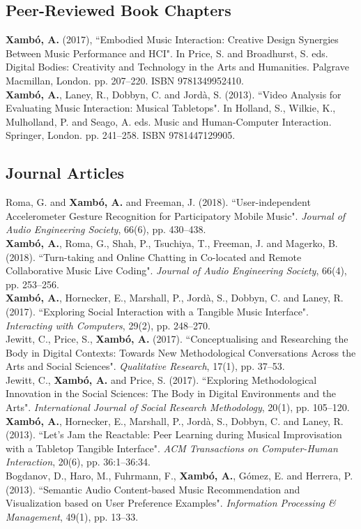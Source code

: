 \documentclass[10pt, a4paper]{article}
\newcommand{\years}[1]{\marginnote{\scriptsize #1}}
\begin{document}
\subsection*{Peer-Reviewed Book Chapters}
\noindent
\years{2016}\textbf{Xambó, A.} (2017), “Embodied Music Interaction: Creative Design Synergies Between Music Performance and HCI". In Price, S. and Broadhurst, S. eds. Digital Bodies: Creativity and Technology in the Arts and Humanities. Palgrave Macmillan, London. pp. 207--220. ISBN 9781349952410.\\
\years{2013}\textbf{Xambó, A.}, Laney, R., Dobbyn, C. and Jordà, S. (2013). “Video Analysis for Evaluating Music Interaction: Musical Tabletops". In Holland, S., Wilkie, K., Mulholland, P. and Seago, A. eds. Music and Human-Computer Interaction. Springer, London. pp. 241--258. ISBN 9781447129905.\\

\subsection*{Journal Articles}
\noindent
\years{2018b}Roma, G. and \textbf{Xambó, A.} and Freeman, J. (2018). “User-independent Accelerometer Gesture Recognition for Participatory Mobile Music". \emph{Journal of Audio Engineering Society}, 66(6), pp. 430--438.\\
\years{2018a}\textbf{Xambó, A.}, Roma, G., Shah, P., Tsuchiya, T., Freeman, J. and Magerko, B. (2018). “Turn-taking and Online Chatting in Co-located and Remote Collaborative Music Live Coding". \emph{Journal of Audio Engineering Society}, 66(4), pp. 253--256.\\
\years{2017c}\textbf{Xambó, A.}, Hornecker, E., Marshall, P., Jordà, S., Dobbyn, C. and Laney, R. (2017). “Exploring Social Interaction with a Tangible Music Interface". \emph{Interacting with Computers}, 29(2), pp. 248--270.\\
\years{2017b}Jewitt, C., Price, S., \textbf{Xambó, A.} (2017). “Conceptualising and Researching the Body in Digital Contexts: Towards New Methodological Conversations Across the Arts and Social Sciences". \emph{Qualitative Research}, 17(1), pp. 37--53.\\
\years{2017a}Jewitt, C., \textbf{Xambó, A.} and Price, S. (2017). “Exploring Methodological Innovation in the Social Sciences: The Body in Digital Environments and the Arts". \emph{International Journal of Social Research Methodology},  20(1), pp. 105--120.\\
\years{2013b}\textbf{Xambó, A.}, Hornecker, E., Marshall, P., Jordà, S., Dobbyn, C. and Laney, R. (2013). “Let's Jam the Reactable: Peer Learning during Musical Improvisation with a Tabletop Tangible Interface". \emph{ACM Transactions on Computer-Human Interaction}, 20(6), pp. 36:1--36:34.\\
\years{2013a}Bogdanov, D., Haro, M., Fuhrmann, F., \textbf{Xambó, A.}, Gómez, E. and Herrera, P. (2013). “Semantic Audio Content-based Music Recommendation and Visualization based on User Preference Examples". \emph{Information Processing \& Management}, 49(1), pp. 13--33.\\
\end{document}

